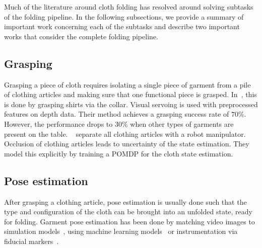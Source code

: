 Much of the literature around cloth folding has resolved around solving subtasks of the folding pipeline. In the following subsections, we provide a summary of important work concerning each of the subtasks and describe two important works that consider the complete folding pipeline.

\subsection{Grasping}
Grasping a piece of cloth requires isolating a single piece of garment from a pile of clothing articles and making sure that one functional piece is grasped. In~\autocite{Ramisa2012}, this is done by grasping shirts via the collar. Visual servoing is used with preprocessed features on depth data. Their method achieves a grasping success rate of $70\%$. However, the performance drops to $30\%$ when other types of garments are present on the table. ~\autocite{Monso2012} separate all clothing articles with a robot manipulator. Occlusion of clothing articles leads to uncertainty of the state estimation. They model this explicitly by training a \acrshort{POMDP} for the cloth state estimation.

\subsection{Pose estimation}
After grasping a clothing article, pose estimation is usually done such that the type and configuration of the cloth can be brought into an unfolded state, ready for folding. Garment pose estimation has been done by matching video images to simulation models~\autocite{Kita2002}, using machine learning models~\autocite{Li2014, li2014volum} or instrumentation via fiducial markers~\autocite{Bersch2011}.

